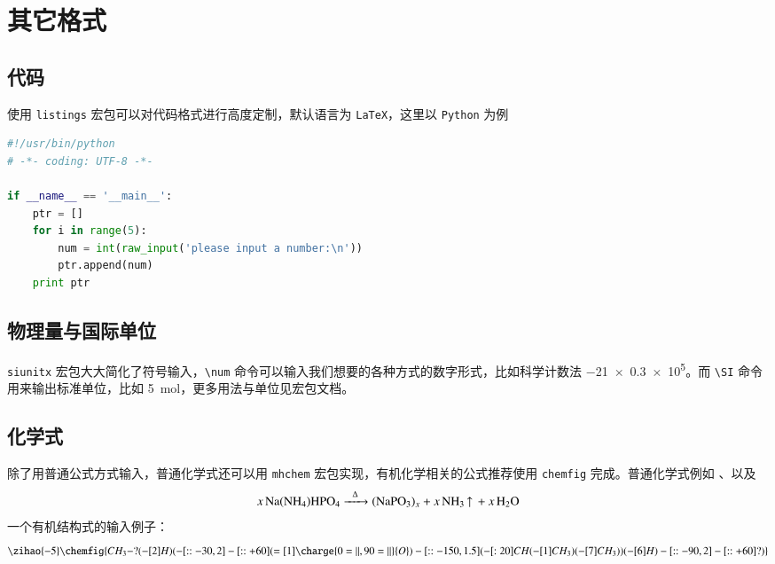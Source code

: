 
\chapter{其它格式}

\section{代码}
使用 \lstinline{listings} 宏包可以对代码格式进行高度定制，默认语言为 \lstinline{LaTeX}，这里以 \lstinline{Python} 为例
\begin{lstlisting}[language=Python,caption={python程序练习题}]
#!/usr/bin/python
# -*- coding: UTF-8 -*-
    
if __name__ == '__main__':
    ptr = []
    for i in range(5):
        num = int(raw_input('please input a number:\n'))
        ptr.append(num)
    print ptr    
\end{lstlisting}

\section{物理量与国际单位}
\lstinline{siunitx} 宏包大大简化了符号输入，\lstinline{\num} 命令可以输入我们想要的各种方式的数字形式，比如科学计数法 \num{-21x.3e5}。而 \lstinline{\SI} 命令用来输出标准单位，比如 \SI{5}{\mole}，更多用法与单位见宏包文档。

\section{化学式}
除了用普通公式方式输入，普通化学式还可以用 \lstinline{mhchem} 宏包实现，有机化学相关的公式推荐使用 \lstinline{chemfig} 完成。普通化学式例如 、以及
    \[\ce{x Na(NH4)HPO4 ->[\Delta] (NaPO3)_x + x NH3 ^ + x H2O}\]
一个有机结构式的输入例子：
    \[\zihao{-5}\chemfig{CH_3-?(-[2]H)(-[::-30,2]-[::+60](=[1]\charge{0=\|,90=\|}{O})
    -[::-150,1.5](-[:20]CH(-[1]CH_3)(-[7]CH_3))(-[6]H)-[::-90,2]-[::+60]?)}\]